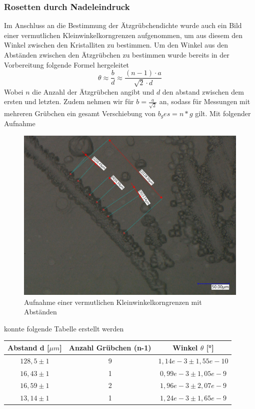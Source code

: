         \subsubsection*{Rosetten durch Nadeleindruck}
            Im Anschluss an die Bestimmung der Ätzgrübchendichte wurde auch ein Bild einer vermutlichen Kleinwinkelkorngrenzen aufgenommen, um aus diesem
            den Winkel zwischen den Kristalliten zu bestimmen. Um den Winkel aus den Abständen zwischen den Ätzgrübchen zu bestimmen wurde bereits in der Vorbereitung
            folgende Formel hergeleitet
            \begin{equation}
                \theta \approx \frac{b}{d} \approx \frac{(n-1)\cdot a}{\sqrt{2}\cdot d}
            \end{equation}
            Wobei $n$ die Anzahl der Ätzgrübchen angibt und $d$ den abstand zwischen dem ersten und letzten. Zudem nehmen wir für $b=\frac{a}{\sqrt{2}}$ an, sodass für
            Messungen mit mehreren Grübchen ein gesamt Verschiebung von $b_ges = n * g$ gilt.
            Mit folgender Aufnahme
            \begin{figure}[H]
                \centering
                \includegraphics[width=\textwidth]{Images/kleinwinkelkorngrenze 2.jpg}
                \caption{Aufnahme einer vermutlichen Kleinwinkelkorngrenzen mit Abständen}
            \end{figure}
            konnte folgende Tabelle erstellt werden
            \begin{table}[H]
                \centering
                \begin{tabular}[]{c|c|c}
                    Abstand d [$\mu m$] & Anzahl Grübchen (n-1) & Winkel $\theta$ [°] \\
                    \hline
                    $128,5 \pm 1$ & 9 & $1,14e-3 \pm 1,55e-10$\\
                    $16,43 \pm 1$ & 1 & $0,99e-3 \pm 1,05e-9$\\
                    $16,59 \pm 1$ & 2 & $1,96e-3 \pm 2,07e-9$\\
                    $13,14 \pm 1$ & 1 & $1,24e-3 \pm 1,65e-9$\\   
                \end{tabular}
            \end{table}
